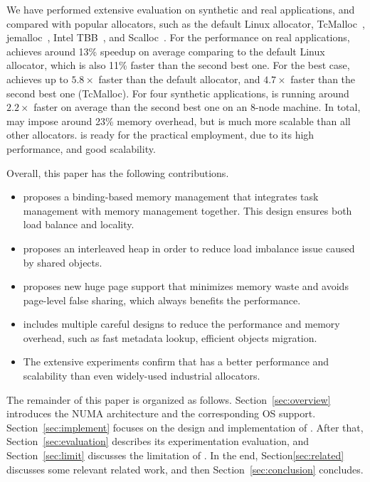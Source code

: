 We have performed extensive evaluation on synthetic and real applications, and compared \NM{} with popular allocators, such as the default Linux allocator, TcMalloc~\cite{tcmalloc}, jemalloc~\cite{jemalloc}, Intel TBB~\cite{tbb}, and Scalloc~\cite{Scalloc}. For the performance on real applications, \NM{} achieves around 13\% speedup on average comparing to the default Linux allocator, which is also 11\% faster than the second best one. For the best case, \NM{} achieves up to $5.8\times$ faster than the default allocator, and $4.7\times$ faster than the second best one (TcMalloc). For four synthetic applications, \NM{} is running around $2.2\times$ faster on average than the second best one on an 8-node machine. In total, \NM{} may impose around 23\% memory overhead, but is much more scalable than all other allocators.  \NM{} is ready for the practical employment, due to its high performance, and good scalability. 

Overall, this paper has the following contributions. 

\begin{itemize}
\item \NM{} proposes a binding-based memory management that integrates task management with memory management together. This design ensures both load balance and locality.  
\item \NM{} proposes an interleaved heap in order to reduce load imbalance issue caused by shared objects. 
\item \NM{} proposes new huge page support that  minimizes memory waste and avoids page-level false sharing, which always benefits the performance. 
\item \NM{} includes multiple careful designs to reduce the performance and memory overhead, such as fast metadata lookup, efficient objects migration. 
\item The extensive experiments confirm that \NM{} has a better performance and scalability than even widely-used industrial allocators. 
\end{itemize}

The remainder of this paper is organized as follows. Section~\ref{sec:overview} introduces the NUMA architecture and the corresponding OS support. Section~\ref{sec:implement} focuses on the design and implementation of \NM{}. After that, Section~\ref{sec:evaluation} describes its experimentation evaluation, and Section~\ref{sec:limit} discusses the limitation of \NM{}. In the end, Section\ref{sec:related} discusses some relevant related work, and then Section~\ref{sec:conclusion} concludes. 

